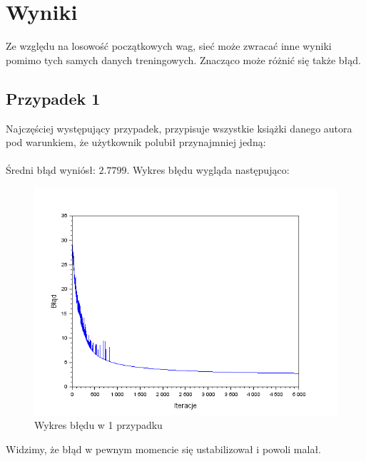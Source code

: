 \section{Wyniki}
    Ze względu na losowość początkowych wag, sieć może zwracać inne wyniki pomimo
    tych samych danych treningowych. Znacząco może różnić się także błąd.

    \subsection{Przypadek 1}
        Najczęściej występujący przypadek, przypisuje wszystkie książki danego autora
        pod warunkiem, że użytkownik polubił przynajmniej jedną:

        \paragraph{}
            Średni błąd wyniósł: $2.7799$. Wykres błędu wygląda następująco:

            \begin{figure}[H]
                \centering

                \includegraphics[width=\textwidth]{img/wykres_1.png}

                \caption{Wykres błędu w 1 przypadku}

                \label{rys:1}
            \end{figure}

            Widzimy, że błąd w pewnym momencie się ustabilizował i powoli malał.

